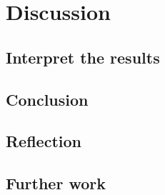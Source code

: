 \chapter{Discussion}

\section{Interpret the results}

\section{Conclusion}

\section{Reflection}

\section{Further work}

